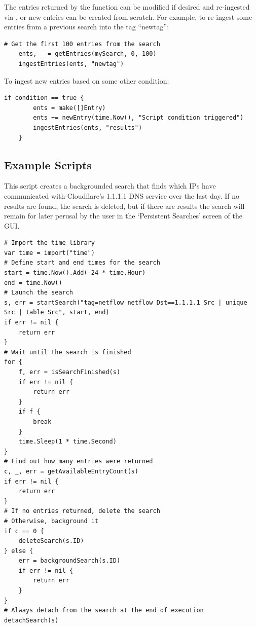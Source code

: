 The entries returned by the  function can be modified if
desired and re-ingested via , or new entries can be created
from scratch. For example, to re-ingest some entries from a previous search
into the tag ``newtag'':

\begin{Verbatim}[breaklines=true]
    # Get the first 100 entries from the search
    ents, _ = getEntries(mySearch, 0, 100)
    ingestEntries(ents, "newtag")
\end{Verbatim}

To ingest new entries based on some other condition:

\begin{Verbatim}[breaklines=true]
    if condition == true {
        ents = make([]Entry)
        ents += newEntry(time.Now(), "Script condition triggered")
        ingestEntries(ents, "results")
    }
\end{Verbatim}

\subsection{Example Scripts}

This script creates a backgrounded search that finds which IPs have
communicated with Cloudflare's 1.1.1.1 DNS service over the last day. If
no results are found, the search is deleted, but if there are results
the search will remain for later perusal by the user in the `Persistent
Searches' screen of the GUI.



\begin{Verbatim}[breaklines=true]
# Import the time library
var time = import("time")
# Define start and end times for the search
start = time.Now().Add(-24 * time.Hour)
end = time.Now()
# Launch the search
s, err = startSearch("tag=netflow netflow Dst==1.1.1.1 Src | unique Src | table Src", start, end)
if err != nil {
    return err
}
# Wait until the search is finished
for {
    f, err = isSearchFinished(s)
    if err != nil {
        return err
    }
    if f {
        break
    }
    time.Sleep(1 * time.Second)
}
# Find out how many entries were returned
c, _, err = getAvailableEntryCount(s)
if err != nil {
    return err
}
# If no entries returned, delete the search
# Otherwise, background it
if c == 0 {
    deleteSearch(s.ID)
} else {
    err = backgroundSearch(s.ID)
    if err != nil {
        return err
    }
}
# Always detach from the search at the end of execution
detachSearch(s)
\end{Verbatim}


